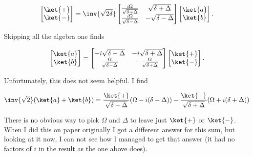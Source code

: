 {\begin{equation}\label{eqn:qmIexamPractice2008Dec:2:150}
\begin{bmatrix}
\ket{+} \\
\ket{-} \\
\end{bmatrix}
=\inv{\sqrt{2\delta}}
\begin{bmatrix}
\frac{i \Omega}{\sqrt{\delta + \Delta}} & \sqrt{\delta + \Delta} \\
\frac{i \Omega}{\sqrt{\delta - \Delta}} & -\sqrt{\delta - \Delta}
\end{bmatrix}
\begin{bmatrix}
\ket{a} \\
\ket{b} \\
\end{bmatrix}.
\end{equation}

Skipping all the algebra one finds

\begin{equation}\label{eqn:qmIexamPractice2008Dec:2:160}
\begin{bmatrix}
\ket{a} \\
\ket{b} \\
\end{bmatrix}
=
\begin{bmatrix}
-i\sqrt{\delta - \Delta} & -i\sqrt{\delta + \Delta} \\
\frac{\Omega}{\sqrt{\delta - \Delta}} &
-\frac{\Omega}{\sqrt{\delta + \Delta}}
\end{bmatrix}
\begin{bmatrix}
\ket{+} \\
\ket{-} \\
\end{bmatrix}.
\end{equation}

Unfortunately, this does not seem helpful.  I find

\begin{equation}\label{eqn:qmIexamPractice2008Dec:2:170}
\inv{\sqrt{2}} ( \ket{a} + \ket{b} ) =
\frac{\ket{+}}{\sqrt{\delta - \Delta}}( \Omega - i (\delta - \Delta) )
-\frac{\ket{-}}{\sqrt{\delta + \Delta}}( \Omega + i (\delta + \Delta) )
\end{equation}

There is no obvious way to pick \(\Omega\) and \(\Delta\) to leave just \(\ket{+}\) or \(\ket{-}\).  When I did this on paper originally I got a different answer for this sum, but looking at it now, I can not see how I managed to get that answer (it had no factors of \(i\) in the result as the one above does).

}
